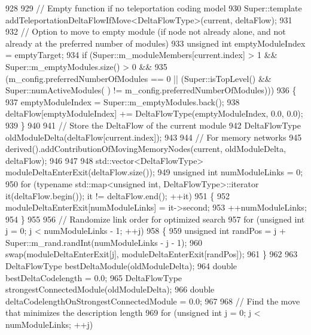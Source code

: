 \begin{DoxyCode}
{928 
929         \textcolor{comment}{// Empty function if no teleportation coding model}
930         Super::template addTeleportationDeltaFlowIfMove<DeltaFlowType>(current, deltaFlow);
931 
932         \textcolor{comment}{// Option to move to empty module (if node not already alone, and not already at the preferred
       number of modules)}
933         \textcolor{keywordtype}{unsigned} \textcolor{keywordtype}{int} emptyModuleIndex = emptyTarget;
934         \textcolor{keywordflow}{if} (Super::m\_moduleMembers[current.index] > 1 && Super::m\_emptyModules.size() > 0 &&
935                 (m\_config.preferredNumberOfModules == 0 || (Super::isTopLevel() && Super::numActiveModules(
      ) != m\_config.preferredNumberOfModules)))
936         \{
937             emptyModuleIndex = Super::m\_emptyModules.back();
938             deltaFlow[emptyModuleIndex] += DeltaFlowType(emptyModuleIndex, 0.0, 0.0);
939         \}
940 
941         \textcolor{comment}{// Store the DeltaFlow of the current module}
942         DeltaFlowType oldModuleDelta(deltaFlow[current.index]);
943 
944         \textcolor{comment}{// For memory networks}
945         derived().addContributionOfMovingMemoryNodes(current, oldModuleDelta, deltaFlow);
946 
947 
948         std::vector<DeltaFlowType> moduleDeltaEnterExit(deltaFlow.size());
949         \textcolor{keywordtype}{unsigned} \textcolor{keywordtype}{int} numModuleLinks = 0;
950         \textcolor{keywordflow}{for} (\textcolor{keyword}{typename} std::map<unsigned int, DeltaFlowType>::iterator it(deltaFlow.begin()); it != 
      deltaFlow.end(); ++it)
951         \{
952             moduleDeltaEnterExit[numModuleLinks] = it->second;
953             ++numModuleLinks;
954         \}
955 
956         \textcolor{comment}{// Randomize link order for optimized search}
957         \textcolor{keywordflow}{for} (\textcolor{keywordtype}{unsigned} \textcolor{keywordtype}{int} j = 0; j < numModuleLinks - 1; ++j)
958         \{
959             \textcolor{keywordtype}{unsigned} \textcolor{keywordtype}{int} randPos = j + Super::m\_rand.randInt(numModuleLinks - j - 1);
960             swap(moduleDeltaEnterExit[j], moduleDeltaEnterExit[randPos]);
961         \}
962 
963         DeltaFlowType bestDeltaModule(oldModuleDelta);
964         \textcolor{keywordtype}{double} bestDeltaCodelength = 0.0;
965         DeltaFlowType strongestConnectedModule(oldModuleDelta);
966         \textcolor{keywordtype}{double} deltaCodelengthOnStrongestConnectedModule = 0.0;
967 
968         \textcolor{comment}{// Find the move that minimizes the description length}
969         \textcolor{keywordflow}{for} (\textcolor{keywordtype}{unsigned} \textcolor{keywordtype}{int} j = 0; j < numModuleLinks; ++j)
}
\end{DoxyCode}
